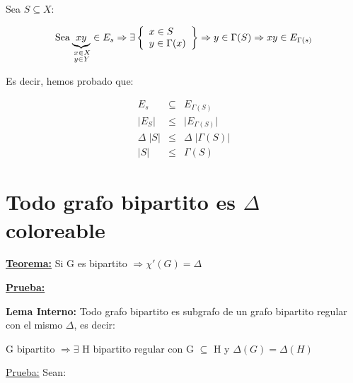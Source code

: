 \documentclass[12pt,a4paper]{report}
\begin{document}
		\vspace{5mm}
		Sea $S \subseteq X$:

		\begin{equation*}
			\text{Sea}
			\underbrace{xy}_{\begin{subarray}{l} \; x \in X \\
	\; y \in Y \end{subarray}} \in E_{s} \Rightarrow
			{\Huge \exists}
  			\left\lbrace
  			\begin{array}{l}
    		 x \in S \\
     		 y \in \Gamma(x) \\
  			\end{array}
 			 \right\rbrace
 			 \Rightarrow y \in \Gamma(S) \Rightarrow xy \in E_{\Gamma(s)}
		\end{equation*}

		\vspace{3mm}
		Es decir, hemos probado que:

		\begin{eqnarray}
			\nonumber E_{s} & \subseteq & E_{\Gamma(S)} \\
			\nonumber \lvert E_{S} \rvert &\leq & \lvert E_{\Gamma(S)} \rvert \\
			\nonumber \Delta \; \lvert S \rvert & \leq & \Delta \; \lvert \Gamma(S) \rvert \\
			\nonumber \lvert S \rvert & \leq & \Gamma(S)
		\end{eqnarray}

	\section{Todo grafo bipartito es $\Delta$ coloreable}

		\textbf{\underline{Teorema:}} Si G es bipartito $\Rightarrow \chi '(G) = \Delta $

		\textbf{\underline{Prueba:}}

		\vspace{3mm}
		\textbf{Lema Interno:} Todo grafo bipartito es subgrafo de un grafo bipartito regular con el mismo $\Delta$, es decir:

		\begin{center}
			G bipartito $\Rightarrow \exists$ H bipartito regular con G $\subseteq$ H y $\Delta(G) = \Delta(H)$
		\end{center}

		\underline{Prueba:} Sean:
\end{document}
